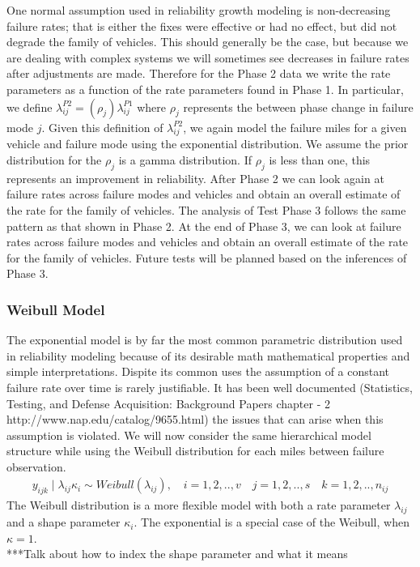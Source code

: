 \documentclass[12pt]{article}
\begin{document}
One normal assumption used in reliability growth modeling is non-decreasing
failure rates; that is either the fixes were effective or had no effect, but did
not degrade the family of vehicles.  This should generally be the case, but
because we are dealing with complex systems we will sometimes see decreases in
failure rates after adjustments are made.  Therefore for the Phase 2 data we
write the rate parameters as a function of the rate parameters found in Phase 1.
In particular, we define $\lambda_{ij}^{P2}=(\rho_{j})\lambda_{ij}^{P1}$ where
$\rho_{j}$ represents the between phase change in failure mode $j$. Given this
definition of $\lambda_{ij}^{P2}$, we again model the failure miles for a given
vehicle and failure mode using the exponential distribution. We assume the prior
distribution for the $\rho_{j}$ is a gamma distribution.  If $\rho_{j}$ is less
than one, this represents an improvement in reliability.  After Phase 2 we can
look again at failure rates across failure modes and vehicles and obtain an
overall estimate of the rate for the family of vehicles.  The analysis of Test
Phase 3 follows the same pattern as that shown in Phase 2. At the end of
Phase 3, we can look at failure rates across failure modes and vehicles and
obtain an overall estimate of the rate for the family of vehicles.
Future tests will be planned based on the inferences of Phase 3.

\subsubsection{Weibull Model}
The exponential model is by far the most common parametric distribution used in
reliability modeling because of its desirable math mathematical properties and
simple interpretations.   Dispite its common uses the assumption of a constant
failure rate over time is rarely justifiable.  It has been well documented
(Statistics, Testing, and Defense Acquisition: Background Papers chapter - 2 http://www.nap.edu/catalog/9655.html)
the issues that can arise when this assumption is violated.  We will now
consider the same hierarchical model structure while using the Weibull
distribution for each miles between failure observation.
\begin{align}
y_{ijk}\mid\lambda_{ij}\kappa_{i}\sim Weibull(\lambda_{ij}), \quad i = 1,2,..,v \quad j=1,2,..,s \quad k=1,2,..,n_{ij}
\end{align}
The Weibull distribution is a more flexible model with both a rate parameter
$\lambda_{ij}$ and a shape parameter $\kappa_{i}$.  The exponential is a special
case of the Weibull, when $\kappa = 1$.
\\
***Talk about how to index the shape parameter and what it means
\end{document}
